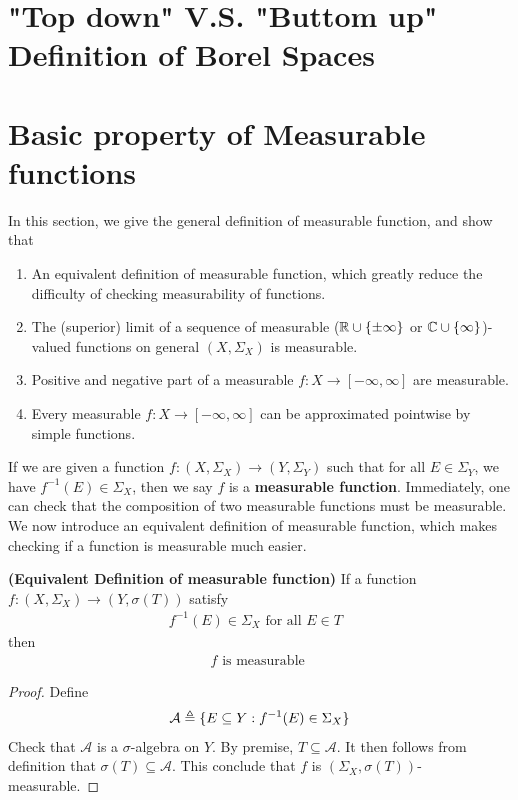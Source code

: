 \documentclass{report}
\begin{document}
\section{"Top down" V.S. "Buttom up" Definition of Borel Spaces}
\section{Basic property of Measurable functions}
\begin{mdframed}
In this section, we give the general definition of measurable function, and show that 
\begin{enumerate}[label=(\alph*)]
  \item An equivalent definition of measurable function, which greatly reduce the difficulty of checking measurability of functions. 
  \item The (superior) limit of a sequence of measurable ($\mathbb{R}\cup \{ \pm \infty \} $ or $\mathbb{C}\cup \{ \infty \}$)-valued functions on general $(X,\Sigma_X)$ is measurable. 
  \item Positive and negative part of a measurable $f:X\rightarrow [-\infty,\infty]$ are measurable. 
  \item Every measurable $f:X\rightarrow [-\infty,\infty]$ can be approximated pointwise by simple functions.
\end{enumerate}
\end{mdframed}
\begin{mdframed}
If we are given a function $f:(X,\Sigma_X)\rightarrow (Y,\Sigma_Y)$ such that for all $E\in \Sigma_Y$, we have $f^{-1}(E) \in \Sigma_X$, then we say $f$ is a  \textbf{measurable function}. Immediately, one can check that the composition of two measurable functions must be measurable. We now introduce an equivalent definition of measurable function, which makes checking if a function is measurable much easier.
\end{mdframed}
\begin{theorem}
\label{EDB}
\textbf{(Equivalent Definition of measurable function)} If a function $f:(X,\Sigma_X)\rightarrow (Y,\sigma (T))$ satisfy 
\begin{align*}
f^{-1}(E)\in \Sigma_X\text{ for all $E \in T$ }
\end{align*}
then 
\begin{align*}
f\text{ is measurable }
\end{align*}
\end{theorem}
\begin{proof}
Define 
\begin{align*}
\mathcal{A}\triangleq \{ E \subseteq Y: f^{-1}(E)\in \Sigma_X \}
\end{align*}
Check that $\mathcal{A}$ is a $\sigma$-algebra on $Y$. By premise, $T \subseteq \mathcal{A}$. It then follows from definition that $\sigma (T)\subseteq \mathcal{A}$. This conclude that $f$ is  $(\Sigma_X, \sigma(T))$-measurable. 
\end{proof}
\end{document}
